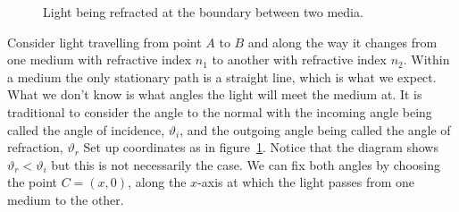    \begin{figure}[ht]
        \centering
        \caption{Light being refracted at the boundary between two media.}
        \label{fig:snell's law by fermat's principle}
    \end{figure}
    Consider light travelling from point \(A\) to \(B\) and along the way it changes from one medium with refractive index \(n_1\) to another with refractive index \(n_2\).
    Within a medium the only stationary path is a straight line, which is what we expect.
    What we don't know is what angles the light will meet the medium at.
    It is traditional to consider the angle to the normal with the incoming angle being called the angle of incidence, \(\vartheta_i\), and the outgoing angle being called the angle of refraction, \(\vartheta_r\)
    Set up coordinates as in figure~\ref{fig:snell's law by fermat's principle}.
    Notice that the diagram shows \(\vartheta_r < \vartheta_i\) but this is not necessarily the case.
    We can fix both angles by choosing the point \(C = (x, 0)\), along the \(x\)-axis at which the light passes from one medium to the other.
    
